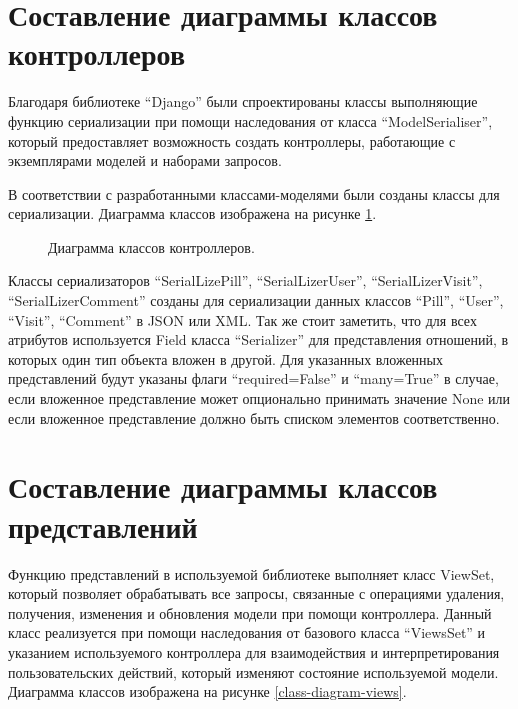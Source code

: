     \section{Составление диаграммы классов контроллеров}
        Благодаря библиотеке “Django” были спроектированы классы выполняющие %
        функцию сериализации при помощи наследования от класса “ModelSerialiser”, %
        который предоставляет возможность создать контроллеры, работающие с экземплярами %
        моделей и наборами запросов.

        В соответствии с разработанными классами-моделями были созданы %
        классы для сериализации. Диаграмма классов изображена на рисунке \ref{class-diagram-serializers}.
        \begin{landscape}
            \begin{figure}[H]%
                \centering
                \caption{Диаграмма классов контроллеров.} \label{class-diagram-serializers}
            \end{figure} 
        \end{landscape}

        Классы сериализаторов “SerialLizePill”, “SerialLizerUser”, %
        “SerialLizerVisit”, “SerialLizerComment” созданы для сериализации %
        данных классов “Pill”, “User”, “Visit”, “Comment” в JSON или XML. %
        Так же стоит заметить, что для всех атрибутов используется Field %
        класса “Serializer” для представления отношений, в которых один тип %
        объекта вложен в другой. Для указанных вложенных представлений будут %
        указаны флаги “required=False” и “many=True” в случае, если вложенное %
        представление может опционально принимать значение None или если вложенное %
        представление должно быть списком элементов соответственно.

    \section{Составление диаграммы классов представлений}
        Функцию представлений в используемой библиотеке выполняет класс ViewSet, %
        который позволяет обрабатывать все запросы, связанные с операциями удаления, %
        получения, изменения и обновления модели при помощи контроллера. Данный класс %
        реализуется при помощи наследования от базового класса “ViewsSet” и указанием %
        используемого контроллера для взаимодействия и интерпретирования пользовательских %
        действий, который изменяют состояние используемой модели. Диаграмма классов %
        изображена на рисунке \ref{class-diagram-views}.

